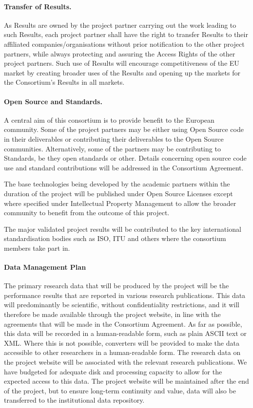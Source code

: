 \documentclass[a4paper,11pt]{article}
\begin{document}
\paragraph{Transfer of Results.}

As Results are owned by the project partner carrying out the work leading
to such Results, each project partner shall have the right to transfer
Results to their affiliated companies/organisations without prior notification to the
other project partners, while always protecting and assuring the Access
Rights of the other project partners.  Such use of Results will encourage
competitiveness of the EU market by creating broader uses of the Results
and opening up the markets for the Consortium's Results in all markets.

\paragraph{Open Source and Standards.}

A central aim of this consortium is to provide benefit to the European community.  Some of the project partners may be either using Open Source code in their deliverables or contributing their deliverables to the Open
Source communities. Alternatively, some of the partners may be contributing to Standards, be they open standards or other. Details concerning open source code use and standard contributions will be
addressed in the Consortium Agreement.

The base technologies being developed by the academic partners within the duration of the project will be published under Open Source Licenses except where specified under Intellectual Property Management to allow the broader community to benefit from the outcome of this project.

The major validated project results  will be contributed to the key international standardisation bodies  such as ISO, ITU and others where the consortium members take part in. 


\paragraph{Data Management Plan}
The primary research data that will be produced by the project will be the performance results that are reported in
various research publications.  This data will predominantly be scientific,
without confidentiality restrictions, and it will
therefore be made available through the project website, in line with the agreements that will be
made in the Consortium Agreement.  As far as possible, 
this data will be recorded in a human-readable form, such as plain ASCII text
or XML.  Where this is not possible, converters will be provided to make the data accessible to other researchers
in a human-readable form. 
The research data on the project website will be associated with the relevant research publications. 
We have budgeted for adequate disk and processing capacity to allow for the expected access to this data.
The project website will be maintained after the end of the project, but to ensure long-term continuity
and value, data will also be transferred to the \SAshort{} institutional data repository.
\end{document}
